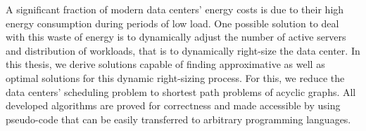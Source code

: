 \thispagestyle{empty}
\vspace*{20mm}

\begin{center}
\textbf{{\abstractname}}
\end{center}

\vspace{10mm}
A significant fraction of modern data centers' energy costs is due to their high energy consumption during periods of low load. One possible solution to deal with this waste of energy is to dynamically adjust the number of active servers and distribution of workloads, that is to dynamically right-size the data center. In this thesis, we derive solutions capable of finding approximative as well as optimal solutions for this dynamic right-sizing process. For this, we reduce the data centers' scheduling problem to shortest path problems of acyclic graphs. All developed algorithms are proved for correctness and made accessible by using pseudo-code that can be easily transferred to arbitrary programming languages.

\cleardoublepage{}
